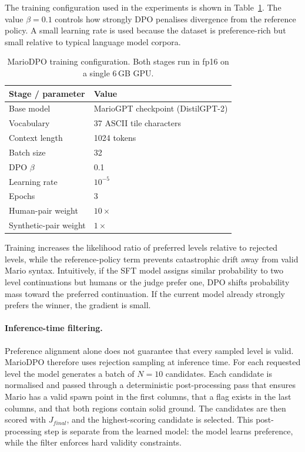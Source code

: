 \documentclass[shortabstract, mgr, english]{iithesis}
\begin{document}
The training configuration used in the experiments is shown in
Table~\ref{tab:dpo-config}. The value $\beta=0.1$ controls how strongly
DPO penalises divergence from the reference policy. A small learning rate is used
because the dataset is preference-rich but small relative to typical language
model corpora.

\begin{table}[H]
\centering
\caption{MarioDPO training configuration. Both stages run in fp16 on a single
$6$\,GB GPU.}
\label{tab:dpo-config}
\begin{tabular}{ll}
\toprule
\textbf{Stage / parameter} & \textbf{Value} \\
\midrule
Base model & MarioGPT checkpoint (DistilGPT-2) \\
Vocabulary & 37 ASCII tile characters \\
Context length & 1024 tokens \\
Batch size & 32 \\
DPO $\beta$ & 0.1 \\
Learning rate & $10^{-5}$ \\
Epochs & 3 \\
Human-pair weight & $10\times$ \\
Synthetic-pair weight & $1\times$ \\
\bottomrule
\end{tabular}
\end{table}

Training increases the likelihood ratio of preferred levels relative to rejected
levels, while the reference-policy term prevents catastrophic drift away from
valid Mario syntax. Intuitively, if the SFT model assigns similar probability to
two level continuations but humans or the judge prefer one, DPO shifts
probability mass toward the preferred continuation. If the current model already
strongly prefers the winner, the gradient is small.

\paragraph{Inference-time filtering.}
Preference alignment alone does not guarantee that every sampled level is valid.
MarioDPO therefore uses rejection sampling at inference time. For each requested
level the model generates a batch of $N=10$ candidates. Each candidate is
normalised and passed through a deterministic post-processing pass that ensures
Mario has a valid spawn point in the first columns, that a flag exists in the
last columns, and that both regions contain solid ground. The candidates
are then scored with $J_{final}$, and the highest-scoring candidate is selected. This post-processing step
is separate from the learned model: the model learns preference,
while the filter enforces hard validity constraints.
\end{document}
